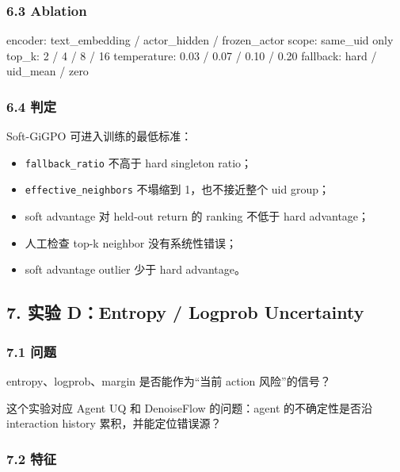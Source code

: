 \documentclass[
  10pt,
]{ctexart}
\newenvironment{Shaded}{}{}
\newcommand{\NormalTok}[1]{#1}
\providecommand{\tightlist}{%
  \setlength{\itemsep}{0pt}\setlength{\parskip}{0pt}}
\begin{document}
\subsubsection{6.3 Ablation}\label{ablation}

\begin{Shaded}
\begin{Highlighting}[]
\NormalTok{encoder: text\_embedding / actor\_hidden / frozen\_actor}
\NormalTok{scope: same\_uid only}
\NormalTok{top\_k: 2 / 4 / 8 / 16}
\NormalTok{temperature: 0.03 / 0.07 / 0.10 / 0.20}
\NormalTok{fallback: hard / uid\_mean / zero}
\end{Highlighting}
\end{Shaded}

\subsubsection{6.4 判定}\label{ux5224ux5b9a-2}

Soft-GiGPO 可进入训练的最低标准：

\begin{itemize}
\tightlist
\item
  \texttt{fallback\_ratio} 不高于 hard singleton ratio；
\item
  \texttt{effective\_neighbors} 不塌缩到 1，也不接近整个 uid group；
\item
  soft advantage 对 held-out return 的 ranking 不低于 hard advantage；
\item
  人工检查 top-k neighbor 没有系统性错误；
\item
  soft advantage outlier 少于 hard advantage。
\end{itemize}

\subsection{7. 实验 D：Entropy / Logprob
Uncertainty}\label{ux5b9eux9a8c-dentropy-logprob-uncertainty}

\subsubsection{7.1 问题}\label{ux95eeux9898-4}

entropy、logprob、margin 是否能作为``当前 action 风险''的信号？

这个实验对应 Agent UQ 和 DenoiseFlow 的问题：agent 的不确定性是否沿
interaction history 累积，并能定位错误源？

\subsubsection{7.2 特征}\label{ux7279ux5f81}
\end{document}
